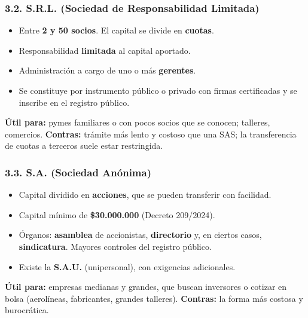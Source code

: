 \subsubsection*{3.2. S.R.L. (Sociedad de Responsabilidad Limitada)}
\begin{itemize}
  \item Entre \textbf{2 y 50 socios}. El capital se divide en \textbf{cuotas}.
  \item Responsabilidad \textbf{limitada} al capital aportado.
  \item Administración a cargo de uno o más \textbf{gerentes}.
  \item Se constituye por instrumento público o privado con firmas certificadas y se inscribe
        en el registro público.
\end{itemize}
\textbf{Útil para:} pymes familiares o con pocos socios que se conocen; talleres, comercios.
\textbf{Contras:} trámite más lento y costoso que una SAS; la transferencia de cuotas a
terceros suele estar restringida.

\subsubsection*{3.3. S.A. (Sociedad Anónima)}
\begin{itemize}
  \item Capital dividido en \textbf{acciones}, que se pueden transferir con facilidad.
  \item Capital mínimo de \textbf{\$30.000.000} (Decreto 209/2024).
  \item Órganos: \textbf{asamblea} de accionistas, \textbf{directorio} y, en ciertos casos,
        \textbf{sindicatura}. Mayores controles del registro público.
  \item Existe la \textbf{S.A.U.} (unipersonal), con exigencias adicionales.
\end{itemize}
\textbf{Útil para:} empresas medianas y grandes, que buscan inversores o cotizar en bolsa
(aerolíneas, fabricantes, grandes talleres).
\textbf{Contras:} la forma más costosa y burocrática.

